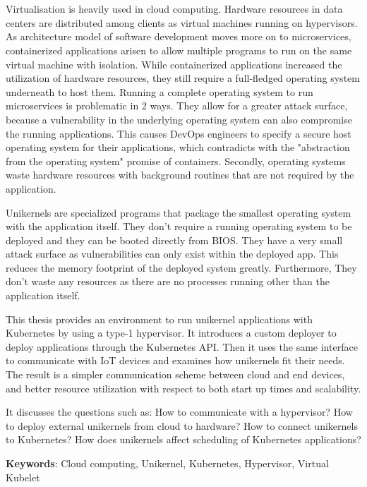 \chapter{\abstractname}

Virtualisation is heavily used in cloud computing. Hardware resources in data centers are distributed among clients as virtual machines running on hypervisors. As architecture model of software development moves more on to microservices, containerized applications arisen to allow multiple programs to run on the same virtual machine with isolation. While containerized applications increased the utilization of hardware resources, they still require a full-fledged operating system underneath to host them.
Running a complete operating system to run microservices is problematic in 2 ways. They allow for a greater attack surface, because a vulnerability in the underlying operating system can also compromise the running applications. This causes DevOps engineers to specify a secure host operating system for their applications, which contradicts with the "abstraction from the operating system" promise of containers. Secondly, operating systems waste hardware resources with background routines that are not required by the application.

Unikernels are specialized programs that package the smallest operating system with the application itself. They don't require a running operating system to be deployed and they can be booted directly from BIOS. They have a very small attack surface as vulnerabilities can only exist within the deployed app. This reduces the memory footprint of the deployed system greatly. Furthermore, They don't waste any resources as there are no processes running other than the application itself.

This thesis provides an environment to run unikernel applications with Kubernetes by using a type-1 hypervisor. It introduces a custom deployer to deploy applications through the Kubernetes API. Then it uses the same interface to communicate with IoT devices and examines how unikernels fit their needs. The result is a simpler communication scheme between cloud and end devices, and better resource utilization with respect to both start up times and scalability.

It discusses the questions such as: How to communicate with a hypervisor? How to deploy external unikernels from cloud to hardware? How to connect unikernels to Kubernetes? How does unikernels affect scheduling of Kubernetes applications?

\textbf{Keywords}: Cloud computing, Unikernel, Kubernetes, Hypervisor, Virtual Kubelet
